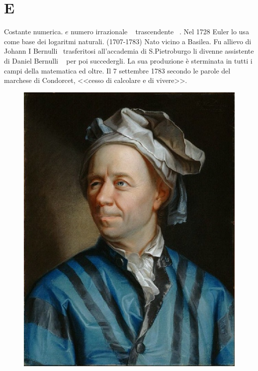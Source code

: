 \chapter{E}
\vspace{5mm} 
 Costante numerica. $e$ numero irrazionale \pointsto~ trascendente \pointsto~. Nel 1728 Euler lo usa come base dei logaritmi naturali.
(1707-1783) Nato vicino a Basilea. Fu allievo di Johann I Bernulli\pointsto~ trasferitosi all'accademia di S.Pietroburgo li divenne assistente di Daniel Bernulli \pointsto~ per poi succedergli. La sua produzione è sterminata in tutti i campi della matematica ed oltre. Il 7 settembre 1783 secondo le parole del marchese di Condorcet, <<cesso di calcolare e di vivere>>. 
\begin{figure}
	\centering
	\label{fig:leonhardeuler}
	\includegraphics[width=0.7\linewidth]{Figure/E/Leonhard_Euler}
\end{figure}

